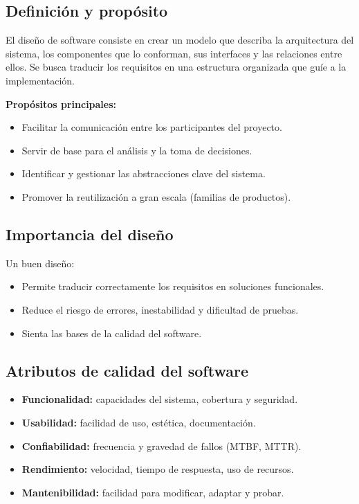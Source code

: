 \subsection{Definición y propósito}\label{subsec:definicion-y-proposito}

\begin{definicion}
    El diseño de software consiste en crear un modelo que describa la arquitectura del sistema, los componentes que lo conforman, sus interfaces y las relaciones entre ellos.
    Se busca traducir los requisitos en una estructura organizada que guíe a la implementación.
\end{definicion}

\textbf{Propósitos principales:}
\begin{itemize}
    \item Facilitar la comunicación entre los participantes del proyecto.
    \item Servir de base para el análisis y la toma de decisiones.
    \item Identificar y gestionar las abstracciones clave del sistema.
    \item Promover la reutilización a gran escala (familias de productos).
\end{itemize}

\subsection{Importancia del diseño}\label{subsec:importancia-del-diseno}

Un buen diseño:
\begin{itemize}
    \item Permite traducir correctamente los requisitos en soluciones funcionales.
    \item Reduce el riesgo de errores, inestabilidad y dificultad de pruebas.
    \item Sienta las bases de la calidad del software.
\end{itemize}

\subsection{Atributos de calidad del software}\label{subsec:atributos-de-calidad-del-software}
\begin{itemize}
    \item \textbf{Funcionalidad:} capacidades del sistema, cobertura y seguridad.
    \item \textbf{Usabilidad:} facilidad de uso, estética, documentación.
    \item \textbf{Confiabilidad:} frecuencia y gravedad de fallos (MTBF, MTTR).
    \item \textbf{Rendimiento:} velocidad, tiempo de respuesta, uso de recursos.
    \item \textbf{Mantenibilidad:} facilidad para modificar, adaptar y probar.
\end{itemize}

